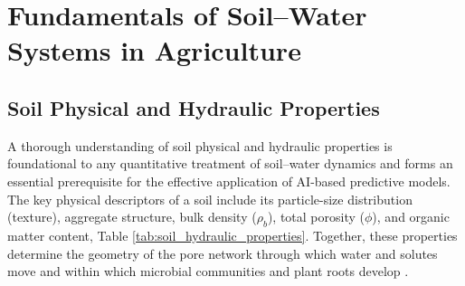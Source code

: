 \documentclass[land,article,submit,pdftex,moreauthors]{Definitions/mdpi}
\numberwithin{equation}{section}
\begin{document}

\section{Fundamentals of Soil--Water Systems in Agriculture}

\subsection{Soil Physical and Hydraulic Properties}

A thorough understanding of soil physical and hydraulic properties is foundational to any quantitative treatment of soil--water dynamics and forms an essential prerequisite for the effective application of AI-based predictive models. The key physical descriptors of a soil include its particle-size distribution (texture), aggregate structure, bulk density ($\rho_b$), total porosity ($\phi$), and organic matter content, Table \ref{tab:soil_hydraulic_properties}. Together, these properties determine the geometry of the pore network through which water and solutes move and within which microbial communities and plant roots develop \citep{hillel2004introduction, Lemenkova202318, Lemenkova202224}.

\footnotesize
\setlength{\LTleft}{0pt}
\setlength{\LTright}{0pt}
\end{document}
